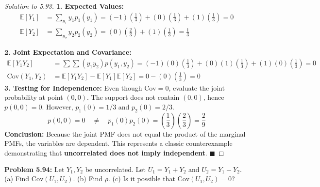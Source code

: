 \documentclass[11pt, a4paper]{article}
\theoremstyle{definition}
\theoremstyle{remark}
\newcommand{\E}{\mathbb{E}}
\newcommand{\Cov}{\mathrm{Cov}}
\begin{document}
\begin{proof}[Solution to 5.93]
\textbf{1. Expected Values:}
\begin{align*}
\E[Y_1] &= \sum_{y_1} y_1 p_1(y_1) = (-1)\left(\frac{1}{3}\right) + (0)\left(\frac{1}{3}\right) + (1)\left(\frac{1}{3}\right) = 0 \\
\E[Y_2] &= \sum_{y_2} y_2 p_2(y_2) = (0)\left(\frac{2}{3}\right) + (1)\left(\frac{1}{3}\right) = \frac{1}{3}
\end{align*}

\textbf{2. Joint Expectation and Covariance:}
\begin{align*}
\E[Y_1 Y_2] &= \sum \sum (y_1 y_2) p(y_1, y_2) = (-1)(0)\left(\frac{1}{3}\right) + (0)(1)\left(\frac{1}{3}\right) + (1)(0)\left(\frac{1}{3}\right) = 0 \\
\Cov(Y_1, Y_2) &= \E[Y_1 Y_2] - \E[Y_1]\E[Y_2] = 0 - (0)\left(\frac{1}{3}\right) = 0
\end{align*}
\textbf{3. Testing for Independence:}
Even though $\Cov = 0$, evaluate the joint probability at point $(0,0)$. The support does not contain $(0,0)$, hence $p(0,0) = 0$. However, $p_1(0) = 1/3$ and $p_2(0) = 2/3$.
\[
p(0,0) = 0 \quad \neq \quad p_1(0)p_2(0) = \left(\frac{1}{3}\right)\left(\frac{2}{3}\right) = \frac{2}{9}
\]
\textbf{Conclusion:} Because the joint PMF does not equal the product of the marginal PMFs, the variables are dependent. This represents a classic counterexample demonstrating that \textbf{uncorrelated does not imply independent}. $\blacksquare$
\end{proof}

\vspace{1em}
\noindent\textbf{Problem 5.94:} Let $Y_1, Y_2$ be uncorrelated. Let $U_1 = Y_1 + Y_2$ and $U_2 = Y_1 - Y_2$. (a) Find $\Cov(U_1, U_2)$. (b) Find $\rho$. (c) Is it possible that $\Cov(U_1, U_2) = 0$?
\end{document}
